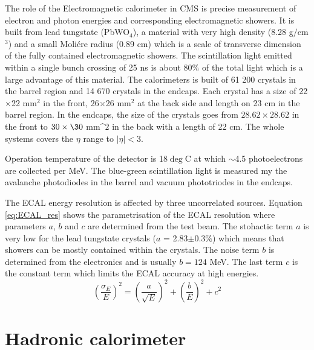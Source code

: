 The role of the Electromagnetic calorimeter in CMS is precise measurement of electron and photon energies and corresponding electromagnetic showers. It is built from lead tungstate (PbWO$_4$), a material with very high density (8.28 g$/$cm$^3$) and a small Moli\'ere radius (0.89 cm) which is a scale of transverse dimension of the fully contained electromagnetic showers. The scintillation light emitted within a single bunch crossing of 25 ns is about 80$\%$ of the total light which is a large advantage of this material. The calorimeters is built of 61 200 crystals in the barrel region and 14 670 crystals in the endcaps. Each crystal has a size of 22$\times$22 mm$^2$ in the front, 26$\times$26 mm$^2$ at the back side and length on 23 cm in the barrel region. In the endcaps, the size of the crystals goes from $28.62\times28.62$ in the front to $30\times\30$ mm^$2$ in the back with a length of 22 cm. The whole systems covers the $\eta$ range to $|\eta|<3$.
\par Operation temperature of the detector is 18$\deg$C at which $\sim$4.5 photoelectrons are collected per MeV. The blue-green scintillation light is measured my the avalanche photodiodes in the barrel and vacuum phototriodes in the endcaps.   
\par The ECAL energy resolution is affected by three uncorrelated sources. Equation \ref{eq:ECAL_res} shows the parametrisation of the ECAL resolution where parameters $a$, $b$ and $c$ are determined from the test beam. The stohactic term $a$ is very low for the lead tungstate crystals ($a$ = 2.83$\pm$0.3$\%$) which means that showers can be mostly contained within the crystals. The noise term $b$ is determined from the electronics and is usually $b=124$ MeV. The last term $c$ is the constant term which limits the ECAL accuracy at high energies.   
\begin{equation}
\left(\frac{\sigma_E}{E}\right)^2 = \left(\frac{a}{\sqrt{E}}\right)^2 + \left(\frac{b}{E}\right)^2 + c^2
\label{eq:ECAL_res}
\end{equation}   


\section{Hadronic calorimeter}

